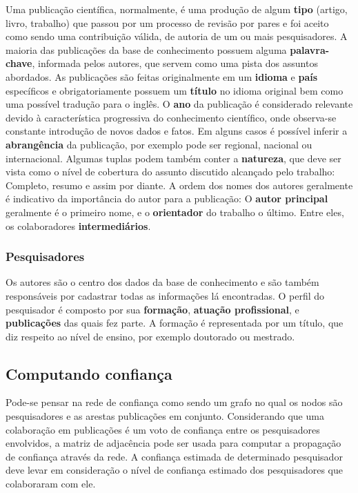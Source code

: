\documentclass[12pt]{article}
\begin{document}
Uma publicação científica, normalmente, é uma produção de algum \textbf{tipo} (artigo, livro, trabalho) que passou por um processo de 
revisão por pares e foi aceito como sendo uma contribuição válida, de autoria de um ou mais pesquisadores. A maioria das 
publicações da base de conhecimento possuem alguma \textbf{palavra-chave}, informada pelos autores, que servem como uma pista 
dos assuntos abordados. As publicações são feitas originalmente em um \textbf{idioma} e \textbf{país} específicos e 
obrigatoriamente possuem um \textbf{título} no idioma original bem como uma possível tradução para o inglês. O \textbf{ano} da 
publicação é considerado relevante devido à característica progressiva do conhecimento científico, onde observa-se constante 
introdução de novos dados e fatos. Em alguns casos é possível inferir a \textbf{abrangência} da publicação, por exemplo pode 
ser regional, nacional ou internacional. Algumas tuplas podem também conter a \textbf{natureza}, que deve ser vista como o 
nível de cobertura do assunto discutido alcançado pelo trabalho: Completo, resumo e assim por diante. A ordem dos nomes dos 
autores geralmente é indicativo da importância do autor para a publicação: O \textbf{autor principal} geralmente é o primeiro 
nome, e o \textbf{orientador} do trabalho o último. Entre eles, os colaboradores \textbf{intermediários}.  

\subsubsection{Pesquisadores}

Os autores são o centro dos dados da base de conhecimento e são também responsáveis por cadastrar todas as informações lá 
encontradas. O perfil do pesquisador é composto por sua \textbf{formação}, \textbf{atuação profissional}, e 
\textbf{publicações} das quais fez parte. A formação é representada por um título, que diz respeito ao nível de ensino, por 
exemplo doutorado ou mestrado. 


\subsection{Computando confiança} \label{sect:computing-trust}

Pode-se pensar na rede de confiança como sendo um grafo no qual os nodos são pesquisadores e as arestas publicações em conjunto.
Considerando que uma colaboração em publicações é um voto de confiança entre os pesquisadores envolvidos, a matriz de adjacência 
pode ser usada para computar a propagação de confiança através da rede. A confiança estimada de determinado pesquisador deve levar 
em consideração o nível de confiança estimado dos pesquisadores que colaboraram com ele.
\end{document}
